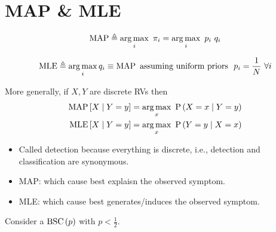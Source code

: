 \section{MAP \& MLE}
\begin{definition}
  \begin{displaymath}
    \operatorname{\mathrm{MAP}} \triangleq \operatorname*{arg\,max}_i\ \pi_i = \operatorname*{arg\,max}_i\ p_i\ q_i
  \end{displaymath}
\end{definition}
\begin{definition}
  \begin{displaymath}
    \operatorname{\mathrm{MLE}} \triangleq \operatorname*{arg\,max}_i q_i \equiv \operatorname{\mathrm{MAP}} \text{ assuming uniform priors }\ p_i = \frac{1}{N}\ \forall i
  \end{displaymath}
\end{definition}
More generally, if $X,Y$ are discrete RVs then
\begin{align*}
  \operatorname{\mathrm{MAP}}\left[X \mid Y=y\right] &= \operatorname*{arg\,max}_x\ \operatorname{\mathrm{P}}\left(X=x \mid Y=y\right) \\
  \operatorname{\mathrm{MLE}}\left[X \mid Y=y\right] &= \operatorname*{arg\,max}_x\ \operatorname{\mathrm{P}}\left(Y=y \mid X=x\right)
\end{align*}
\begin{itemize}
  \item Called detection because everything is discrete, i.e.,
    detection and classification are synonymous.
  \item MAP: which cause best explaisn the observed symptom.
  \item MLE: which cause best generates/induces the observed symptom.
\end{itemize}
\begin{example}
  Consider a $\operatorname{\mathrm{BSC}}\left(p\right)$ with $p < \frac{1}{2}$.
\end{example}
\begin{center}
\end{center}
